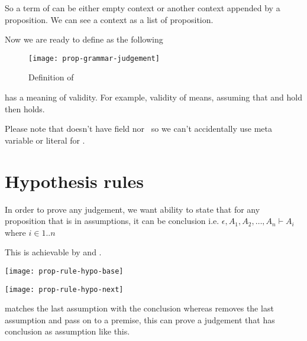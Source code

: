 \documentclass[master.tex]{subfiles}
\begin{document}
\newcommand{\propEmptyContext}{\bat{\pifmt{$\epsilon$}}}

So a term of  can be either empty context or another context
appended by a proposition. We can see a context as a list of proposition.

Now we are ready to define  as the following

\begin{figure}[H]
    \centering
\begin{minipage}{0.7\textwidth}
    \texttt{[image: prop-grammar-judgement]}
\end{minipage}
\caption{Definition of }
\label{fig:prop-grammar-judgement}
\end{figure}

\newcommand{\propTurnstile}{\pifmt{$\vdash$}}

 has a meaning of validity. For example, validity of
 means, assuming that  and
 hold then  holds.

Please note that  doesn't have field \kMetaVarRegex nor
\kLiteralRegex \ so we can't accidentally use meta variable or literal for
.

\section{Hypothesis rules}
\label{sec:hypothesis_rules}

In order to prove any judgement, we want ability to state that for any
proposition that is in assumptions, it can be conclusion i.e. $\epsilon, A_1,
A_2, \ldots, A_n \vdash A_i$ where $i \in {1..n}$

This is achievable by  and .

\begin{center}
\texttt{[image: prop-rule-hypo-base]}
\end{center}
\begin{center}
\texttt{[image: prop-rule-hypo-next]}
\end{center}

 matches the last assumption with the conclusion whereas
 removes the last assumption and pass on to a premise,
this can prove a judgement that has conclusion as assumption like this.
\end{document}
